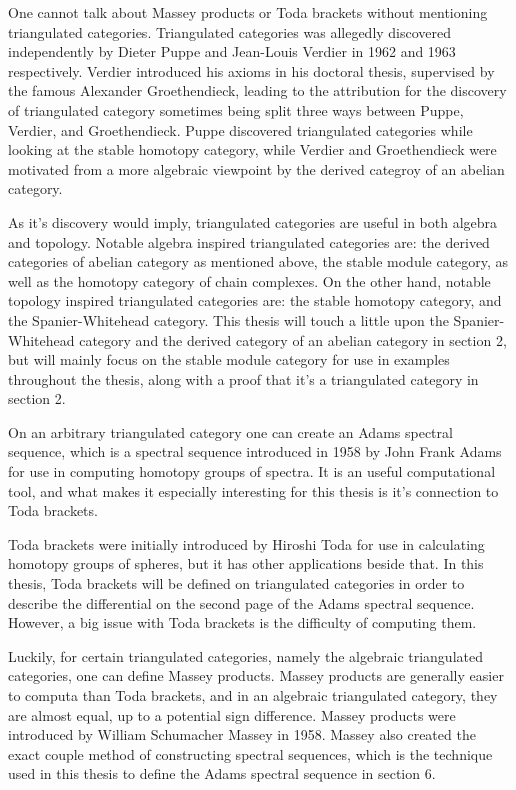 One cannot talk about Massey products or Toda brackets without mentioning triangulated categories. Triangulated categories was allegedly discovered independently by Dieter Puppe and Jean-Louis Verdier in 1962 and 1963 respectively. Verdier introduced his axioms in his doctoral thesis, supervised by the famous Alexander Groethendieck, leading to the attribution for the discovery of triangulated category sometimes being split three ways between Puppe, Verdier, and Groethendieck. Puppe discovered triangulated categories while looking at the stable homotopy category, while Verdier and Groethendieck were motivated from a more algebraic viewpoint by the derived categroy of an abelian category.

As it's discovery would imply, triangulated categories are useful in both algebra and topology. Notable algebra inspired triangulated categories are: the derived categories of abelian category as mentioned above, the stable module category, as well as the homotopy category of chain complexes. On the other hand, notable topology inspired triangulated categories are: the stable homotopy category, and the Spanier-Whitehead category. This thesis will touch a little upon the Spanier-Whitehead category and the derived category of an abelian category in section 2, but will mainly focus on the stable module category for use in examples throughout the thesis, along with a proof that it's a triangulated category in section 2.

On an arbitrary triangulated category one can create an Adams spectral sequence, which is a spectral sequence introduced in 1958 by John Frank Adams for use in computing homotopy groups of spectra. It is an useful computational tool, and what makes it especially interesting for this thesis is it's connection to Toda brackets.

Toda brackets were initially introduced by Hiroshi Toda for use in calculating homotopy groups of spheres, but it has other applications beside that. In this thesis, Toda brackets will be defined on triangulated categories in order to describe the differential on the second page of the Adams spectral sequence. However, a big issue with Toda brackets is the difficulty of computing them.

Luckily, for certain triangulated categories, namely the algebraic triangulated categories, one can define Massey products. Massey products are generally easier to computa than Toda brackets, and in an algebraic triangulated category, they are almost equal, up to a potential sign difference. Massey products were introduced by William Schumacher Massey in 1958. Massey also created the exact couple method of constructing spectral sequences, which is the technique used in this thesis to define the Adams spectral sequence in section 6.

